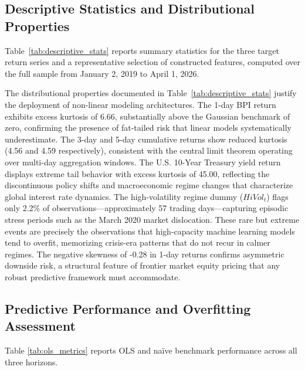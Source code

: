 \documentclass[12pt]{article}
\begin{document}
\subsection{Descriptive Statistics and Distributional Properties}

Table~\ref{tab:descriptive_stats} reports summary statistics for the three target return series and a representative selection of constructed features, computed over the full sample from January 2, 2019 to April 1, 2026.



The distributional properties documented in Table~\ref{tab:descriptive_stats} justify the deployment of non-linear modeling architectures. The 1-day BPI return exhibits excess kurtosis of 6.66, substantially above the Gaussian benchmark of zero, confirming the presence of fat-tailed risk that linear models systematically underestimate. The 3-day and 5-day cumulative returns show reduced kurtosis (4.56 and 4.59 respectively), consistent with the central limit theorem operating over multi-day aggregation windows. The U.S. 10-Year Treasury yield return displays extreme tail behavior with excess kurtosis of 45.00, reflecting the discontinuous policy shifts and macroeconomic regime changes that characterize global interest rate dynamics. The high-volatility regime dummy ($HiVol_t$) flags only 2.2\% of observations---approximately 57 trading days---capturing episodic stress periods such as the March 2020 market dislocation. These rare but extreme events are precisely the observations that high-capacity machine learning models tend to overfit, memorizing crisis-era patterns that do not recur in calmer regimes. The negative skewness of -0.28 in 1-day returns confirms asymmetric downside risk, a structural feature of frontier market equity pricing that any robust predictive framework must accommodate.

\subsection{Predictive Performance and Overfitting Assessment}

Table \ref{tab:ols_metrics} reports OLS and naïve benchmark performance across all three horizons.


\end{document}
